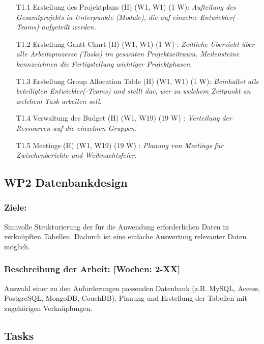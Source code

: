 \documentclass{scrreprt}
\begin{document}
\begin{enumerate}
\item [T1.1] Erstellung des Projektplans (H) (W1, W1) (1 W): \emph{ Aufteilung des Gesamtprojekts in Unterpunkte (Module), die auf einzelne Entwickler(-Teams) aufgeteilt werden.}
\item [T1.2] Erstellung Gantt-Chart (H) (W1, W1) (1 W) : \emph{ Zeitliche Übersicht über alle Arbeitsprozesse (Tasks) im gesamten Projektzeitraum. Meilensteine kennzeichnen die Fertigstellung wichtiger Projektphasen.}
\item [T1.3] Erstellung Group Allocation Table (H) (W1, W1) (1 W): \emph{ Beinhaltet alle beteiligten Entwickler(-Teams) und stellt dar, wer zu welchem Zeitpunkt an welchem Task arbeiten soll.}
\item [T1.4] Verwaltung des Budget (H) (W1, W19) (19 W) : \emph{Verteilung der Ressourcen auf die einzelnen Gruppen.}
\item [T1.5] Meetings (H) (W1, W19) (19 W) : \emph{Planung von Meetings für Zwischenberichte und Weihnachtsfeier.}
\end{enumerate}

\subsection*{WP2 Datenbankdesign}

\subsubsection{Ziele:} Sinnvolle Strukturierung der für die Anwendung erforderlichen Daten in verknüpften Tabellen. Dadurch ist eine einfache Auswertung relevanter Daten möglich.
\subsubsection{Beschreibung der Arbeit: [Wochen: 2-XX]} Auswahl einer zu den Anforderungen passenden Datenbank (z.B. MySQL, Access, PostgreSQL, MongoDB, CouchDB). Planung und Erstellung der Tabellen mit zugehörigen Verknüpfungen.


\subsection*{Tasks}
\end{document}
